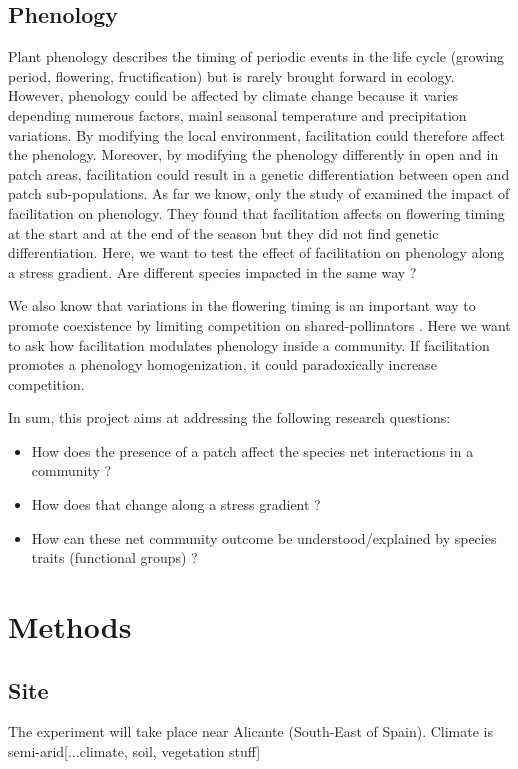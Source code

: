 \documentclass[12pt]{article} %
\begin{document}
\subsection{Phenology}
Plant phenology describes the timing of periodic events in the life cycle (growing period, flowering, fructification) but is rarely brought forward in ecology.
However, phenology could be affected by climate change \citep{Cleland2007} because it varies depending numerous factors, mainl seasonal temperature and precipitation variations. By modifying the local environment, facilitation could therefore affect the phenology. Moreover, by modifying the phenology differently in open and in patch areas, facilitation could result in a genetic differentiation between open and patch sub-populations. As far we know, only the study of \citet{Castellanos2014} examined the impact of facilitation on phenology. They found that facilitation affects on flowering timing at the start and at the end of the season but they did not find genetic differentiation. Here, we want to test the effect of facilitation on phenology along a stress gradient. Are different species impacted in the same way ?

We also know that variations in the flowering timing is an important way to promote coexistence by limiting competition on shared-pollinators \citep{Cleland2006}. Here we want to ask how facilitation modulates phenology inside a community. If facilitation promotes a phenology homogenization, it could paradoxically increase competition. 

In sum, this project aims at addressing the following research questions:
\begin{itemize}
	\item How does the presence of a patch affect the species net interactions in a community ?
	\item How does that change along a stress gradient ?
	\item How can these net community outcome be understood/explained by species traits (functional groups) ?
\end{itemize}

\section{Methods}
\subsection{Site}
The experiment will take place near Alicante (South-East of Spain). Climate is semi-arid[...climate, soil, vegetation stuff]
\end{document}

